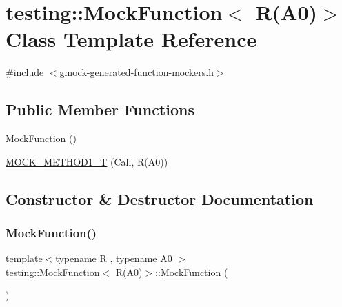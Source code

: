 \hypertarget{classtesting_1_1MockFunction_3_01R_07A0_08_4}{}\section{testing\+::Mock\+Function$<$ R(A0)$>$ Class Template Reference}
\label{classtesting_1_1MockFunction_3_01R_07A0_08_4}


{\ttfamily \#include $<$gmock-\/generated-\/function-\/mockers.\+h$>$}

\subsection*{Public Member Functions}
\begin{DoxyCompactItemize}
\item 
\mbox{\hyperlink{classtesting_1_1MockFunction_3_01R_07A0_08_4_a716abd3e67561edb8e431ffa55c4835d}{Mock\+Function}} ()
\item 
\mbox{\hyperlink{classtesting_1_1MockFunction_3_01R_07A0_08_4_a6a22e7e14b53d2df30bef4404b41fade}{M\+O\+C\+K\+\_\+\+M\+E\+T\+H\+O\+D1\+\_\+T}} (Call, R(A0))
\end{DoxyCompactItemize}


\subsection{Constructor \& Destructor Documentation}
\mbox{\label{classtesting_1_1MockFunction_3_01R_07A0_08_4_a716abd3e67561edb8e431ffa55c4835d}} 
\subsubsection{\texorpdfstring{MockFunction()}{MockFunction()}}
{\footnotesize\ttfamily template$<$typename R , typename A0 $>$ \\
\mbox{\hyperlink{classtesting_1_1MockFunction}{testing\+::\+Mock\+Function}}$<$ R(A0)$>$\+::\mbox{\hyperlink{classtesting_1_1MockFunction}{Mock\+Function}} (\begin{DoxyParamCaption}{ }\end{DoxyParamCaption})\hspace{0.3cm}{\ttfamily [inline]}}



